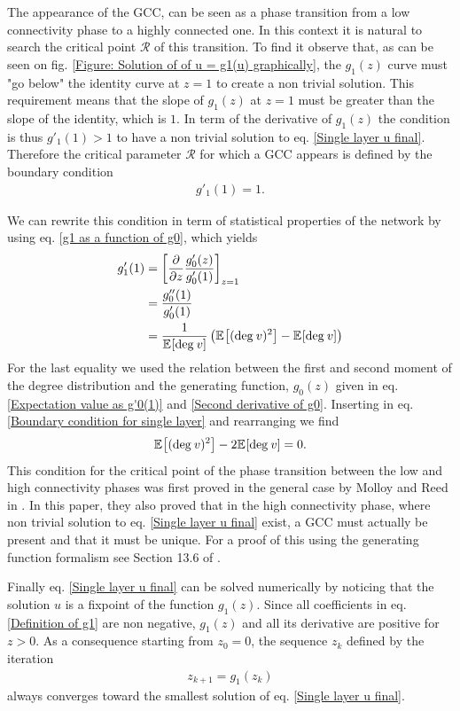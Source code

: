 \documentclass[
11pt, %
american, %
singlespacing, %
final, %
nolistspacing, %
liststotoc, %
headsepline, %
]{MastersDoctoralThesis} %
\begin{document}
The appearance of the GCC, can be seen as a phase transition from a low connectivity phase to a highly connected one. In this context it is natural to search the critical point $\mathcal{R}$ of this transition. To find it observe that, as can be seen on fig. \ref{Figure: Solution of of u = g1(u) graphically}, the $g_1(z)$ curve must "go below" the identity curve at $z = 1$ to create a non trivial solution. This requirement means that the slope of $g_1(z)$ at $z = 1$ must be greater than the slope of the identity, which is $1$. In term of the derivative of $g_1(z)$ the condition is thus $g'_1(1) > 1$ to have a non trivial solution to eq. \eqref{Single layer u final}. Therefore the critical parameter $\mathcal{R}$ for which a GCC appears is defined by the boundary condition
\begin{align}
	g'_1(1) = 1. \label{Boundary condition for single layer}
\end{align}

We can rewrite this condition in term of statistical properties of the network by using eq. \eqref{g1 as a function of g0}, which yields
\begin{align}
	g'_1(1) &= \left[ \frac{\partial}{\partial z} \frac{g'_0(z)}{g'_0(1)} \right]_{z = 1} \\
		&= \frac{g''_0(1)}{g'_0(1)} \\
		&= \frac{1}{\mathbb{E}_{}\!\left[ \mathrm{deg}_{}\, v \right]} \left( \mathbb{E}_{}\!\left[ (\mathrm{deg}_{}\, v)^2 \right] - \mathbb{E}_{}\!\left[ \mathrm{deg}_{}\, v \right] \right)
\end{align}
For the last equality we used the relation between the first and second moment of the degree distribution and the generating function, $g_0(z)$ given in eq. \eqref{Expectation value as g'0(1)} and \eqref{Second derivative of g0}. Inserting in eq. \eqref{Boundary condition for single layer} and rearranging we find
\begin{align}
	\mathbb{E}_{}\!\left[ (\mathrm{deg}_{}\, v)^2 \right] - 2 \mathbb{E}_{}\!\left[ \mathrm{deg}_{}\, v \right] = 0.
\end{align}
This condition for the critical point of the phase transition between the low and high connectivity phases was first proved in the general case by Molloy and Reed in \cite{molloy1995critical}. In this paper, they also proved that in the high connectivity phase, where non trivial solution to eq. \eqref{Single layer u final} exist, a GCC must actually be present and that it must be unique. For a proof of this using the generating function formalism see Section 13.6 of \cite{newman2010networks}.

Finally eq. \eqref{Single layer u final} can be solved numerically by noticing that the solution $u$ is a fixpoint of the function $g_1(z)$. Since all coefficients in eq. \eqref{Definition of g1} are non negative, $g_1(z)$ and all its derivative are positive for $z > 0$. As a consequence starting from $z_0 = 0$, the sequence $z_k$ defined by the iteration
\begin{align}
	z_{k + 1}  = g_1(z_k)  \label{Single layer fixpoint g1 iteration}
\end{align}
always converges toward the smallest solution of eq. \eqref{Single layer u final}.
\end{document}
